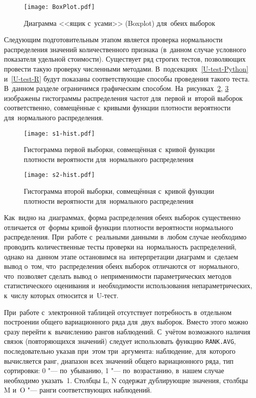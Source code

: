 \documentclass[]{scrreprt}
\begin{document}
%
\begin{figure}[ht]
	\centering
	\texttt{[image: BoxPlot.pdf]}
	\caption{Диаграмма <<ящик с~усами>> (Boxplot) для~обеих выборок }
	\label{fig:BoxPlot}
\end{figure}
%
Следующим подготовительным этапом является проверка нормальности распределения значений количественного признака (в~данном случае условного показателя удельной стоимости). Существует ряд строгих тестов, позволяющих провести такую проверку численными методами. В~подсекциях~\ref{U-test-Python} и~\ref{U-test-R} будут показаны соответствующие способы проведения такого теста. В~данном разделе ограничимся графическим способом. На~рисунках~\ref{fig:s1-hist}, \ref{fig:s2-hist} изображены гистограммы распределения частот для~первой и~второй выборок соответственно, совмещённые с~кривыми функции плотности вероятности для~нормального распределения.
%
\begin{figure}[ht]
	\centering
	\texttt{[image: s1-hist.pdf]}
	\caption{Гистограмма первой выборки, совмещённая с~кривой функции плотности вероятности для~нормального распределения}
	\label{fig:s1-hist}
\end{figure}
%
\begin{figure}[ht]
	\centering
	\texttt{[image: s2-hist.pdf]}
	\caption{Гистограмма второй выборки, совмещённая с~кривой функции плотности вероятности для~нормального распределения}
	\label{fig:s2-hist}
\end{figure}
%

Как~видно на~диаграммах, форма распределения обеих выборок существенно отличается от~формы кривой функции плотности вероятности нормального распределения. При~работе с~реальными данными в~любом случае необходимо проводить количественные тесты проверки на~нормальность распределений, однако на~данном этапе остановимся на~интерпретации диаграмм и~сделаем вывод о~том, что~распределения обеих выборок отличаются от~нормального, что~позволяет сделать вывод о~неприменимости параметрических методов статистического оценивания и~необходимости использования непараметрических, к~числу которых относится и~U-тест.

При~работе с~электронной таблицей отсутствует потребность в~отдельном построении общего вариационного ряда для~двух выборок. Вместо этого можно сразу перейти к~вычислению рангов наблюдений. С~учётом возможного наличия связок (повторяющихся значений) следует использовать функцию \texttt{RANK.AVG}, последовательно указав при~этом три~аргумента: наблюдение, для~которого вычисляется ранг, диапазон всех значений общего вариационного ряда, тип сортировки: 0 "--- по~убыванию, 1 "--- по~возрастанию, в~нашем случае необходимо указать~1. Столбцы L, N содержат дублирующие значения, столбцы M и~O "--- ранги соответствующих наблюдений. 
\end{document}
